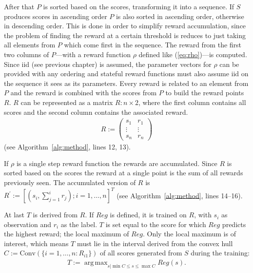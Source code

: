 \documentclass[twoside,11pt]{article}
\DeclareMathOperator*{\argmax}{arg\,max}
\begin{document}
After that $P$ is sorted based on the scores, transforming
it into a sequence.
If $S$ produces scores in ascending order $P$ is also
sorted in ascending order, otherwise in descending order.
This is done in order to simplify reward accumulation,
since the problem of finding the reward at a certain
threshold is reduces to just taking all elements from $P$
which come first in the sequence.
The reward from the first two columns of $P$---with a
reward function $\rho$ defined like (\ref{eq:rho})---is
computed.
Since iid (see previous chapter) is assumed, the parameter
vectors for $\rho$ can be provided with any ordering and
stateful reward functions must also assume iid on the
sequence it sees as its parameters.
Every reward is related to an element from $P$ and the
reward is combined with the scores from $P$ to build the
reward points $R$. $R$ can be represented as a matrix
$R: n \times 2$, where the first column contains all scores
and the second column contains the associated reward.
\begin{align*}
  R :=
    \begin{pmatrix}
      s_1 &r_1 \\
      \vdots &\vdots \\
      s_n &r_n
    \end{pmatrix}
\end{align*}
(see Algorithm~\ref{alg:method}, lines 12, 13).

If $\rho$ is a single step reward function the rewards
are accumulated.
Since $R$ is sorted based on the scores the reward at a
single point is the sum of all rewards previously seen.
The accumulated version of $R$ is
$R^\prime := [(s_i, \sum_{j=1}^{i} r_j); i=1,\dots,n]^T$
(see Algorithm~\ref{alg:method}, lines 14--16).

At last $T$ is derived from $R$. If $Reg$ is defined, it
is trained on $R$, with $s_i$ as observation and $r_i$ as
the label. $T$ is set equal to the score for which $Reg$
predicts the highest reward; the local maximum of $Reg$.
Only the local maximum is of interest, which means $T$
must lie in the interval derived from the convex hull
$C := \text{Conv}(\{i=1,\dots,n:R_{i1}\})$ of
all scores generated from $S$ during the training:
\begin{align}
  \label{eq:T_Reg}
  T := \argmax_{s | \min C \leq s \leq \max C} Reg(s).
\end{align}
\end{document}
